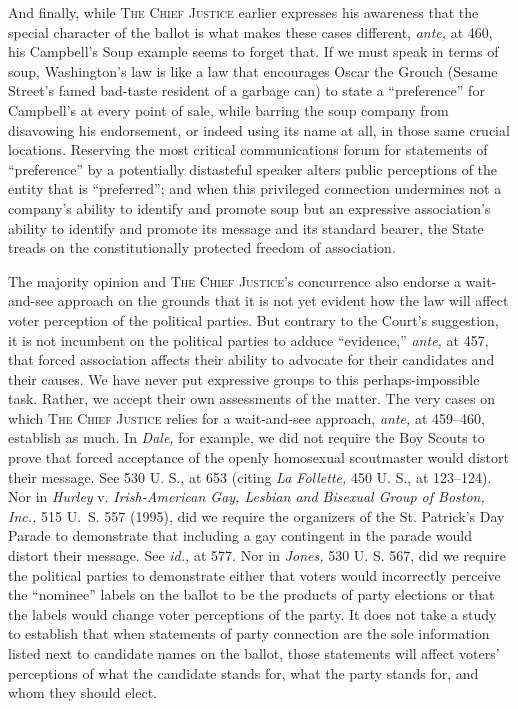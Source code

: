   And finally, while \textsc{The Chief Justice} earlier expresses his
awareness that the special character of the ballot is what makes these
cases different, \emph{ante,} at 460, his Campbell's Soup example
seems to forget that. If we must speak in terms of soup, Washington's
law is like a law that encourages Oscar the Grouch (Sesame Street's
famed bad-taste resident of a garbage can) to state a ``preference''
for Campbell's at every point of sale, while barring the soup company
from disavowing his endorsement, or indeed using its name at all, in
those same crucial locations. Reserving the most critical communications
forum for statements of ``preference'' by a potentially distasteful
speaker alters public perceptions of the entity that is ``preferred'';
and when this privileged connection undermines not a company's ability
to identify and promote soup but an expressive association's ability
to identify and promote its message and its standard bearer, the State
treads on the constitutionally protected freedom of association. \newpage 

  The majority opinion and \textsc{The Chief Justice'}s concurrence also
endorse a wait-and-see approach on the grounds that it is not yet
evident how the law will affect voter perception of the political
parties. But contrary to the Court's suggestion, it is not incumbent
on the political parties to adduce ``evidence,'' \emph{ante,} at 457,
that forced association affects their ability to advocate for their
candidates and their causes. We have never put expressive groups to
this perhaps-impossible task. Rather, we accept their own assessments
of the matter. The very cases on which \textsc{The Chief Justice} relies
for a wait-and-see approach, \emph{ante,} at 459--460, establish as
much. In \emph{Dale,} for example, we did not require the Boy Scouts to
prove that forced acceptance of the openly homosexual scoutmaster would
distort their message. See 530 U. S., at 653 (citing \emph{La Follette,}
450 U. S., at 123--124). Nor in \emph{Hurley} v. \emph{Irish-American Gay,
Lesbian and Bisexual Group of Boston, Inc.,} 515 U.~S. 557 (1995),
did we require the organizers of the St. Patrick's Day Parade to
demonstrate that including a gay contingent in the parade would distort
their message. See \emph{id.,} at 577. Nor in \emph{Jones,} 530 U. S.
567, did we require the political parties to demonstrate either that
voters would incorrectly perceive the ``nominee'' labels on the ballot
to be the products of party elections or that the labels would change
voter perceptions of the party. It does not take a study to establish
that when statements of party connection are the sole information listed
next to candidate names on the ballot, those statements will affect
voters' perceptions of what the candidate stands for, what the party
stands for, and whom they should elect.

